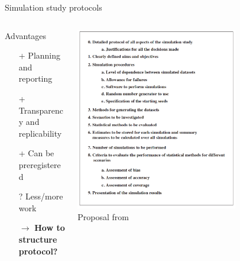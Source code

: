 \documentclass[english, 12pt, aspectratio=169]{beamer}
\begin{document}
\begin{frame}{Simulation study protocols}
  \begin{columns}
    \begin{column}{0.5\textwidth}
      \begin{block}{Advantages}
        \begin{itemize}
        \pause
          \item[+] Planning and reporting
          \pause
          \item[+] Transparency and replicability
          \pause
          \item[+] Can be preregistered
          \pause
          \item[?] Less/more work
        \end{itemize}
      \end{block}

      \begin{block}{}
        \begin{itemize}
          \item[$\rightarrow$] \alert{\textbf{How to structure protocol?}}
        \end{itemize}
      \end{block}

    \end{column}
    \begin{column}{0.5\textwidth}
      \begin{block}{}
      \centering
      \includegraphics[width=0.7\textwidth]{pics/burtonprotocol.png} \\
      Proposal from \citet{Burton2006}
      \end{block}
    \end{column}
  \end{columns}

 \end{frame}
\end{document}

